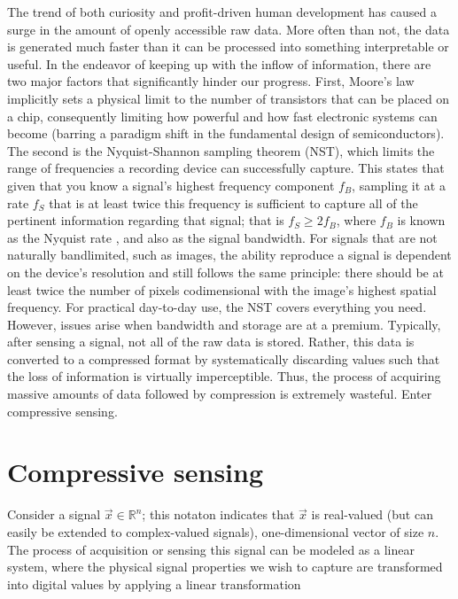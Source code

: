 The trend of both curiosity and profit-driven human development has caused a
surge in the amount of openly accessible raw data. More often than not, the data is generated much faster than it can be processed into something interpretable or useful. In the endeavor of keeping up with the inflow of information, there are two major factors that significantly hinder our progress. First, Moore’s law implicitly sets a physical limit to the number of transistors that can be placed on a chip, consequently limiting how powerful and how fast electronic systems can become (barring a paradigm shift in the fundamental design of semiconductors). The second is the Nyquist-Shannon sampling theorem (NST), which limits the range of frequencies a recording device can successfully capture. This states that given that you know a signal's highest frequency component $f_B$, sampling it at a rate $f_S$ that is at least twice this frequency is sufficient to capture all of the pertinent information regarding that signal; that is $f_S \geq 2f_B$, where $f_B$ is known as the Nyquist rate \cite{Shannon1949}, and also as the signal bandwidth. For signals that are not naturally bandlimited, such as images, the ability reproduce a signal is dependent on the device's resolution and still follows the same principle: there should be at least twice the number of pixels codimensional with the image's highest spatial frequency. For practical day-to-day use, the NST covers everything you need. However, issues arise when bandwidth and storage are at a premium. Typically, after sensing a signal, not all of the raw data is stored. Rather, this data is converted to a compressed format by systematically discarding values such that the loss of information is virtually imperceptible. Thus, the process of acquiring massive amounts of data followed by compression is extremely wasteful. Enter compressive sensing.

\section{Compressive sensing}
\label{sec:cs}

Consider a signal $\vec{x} \in \mathbb{R}^{n}$; this notaton indicates that $\vec{x}$ is real-valued (but can easily be extended to complex-valued signals), one-dimensional vector of size $n$. The process of acquisition or sensing this signal can be modeled as a linear system, where the physical signal properties we wish to capture are transformed into digital values by applying a linear transformation

